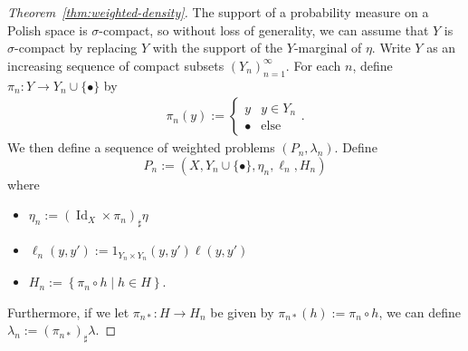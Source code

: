 \documentclass[twoside,11pt]{article}
\DeclareMathOperator{\id}{Id}
\newcommand{\set}[2]{\left\{ #1\middle| #2\right\}}
\begin{document}
\begin{proof}[Theorem~\ref{thm:weighted-density}]
    The support of a probability measure on a Polish space is $\sigma$-compact, so without loss of generality, we can assume that $Y$ is $\sigma$-compact by replacing $Y$ with the support of the $Y$-marginal of $\eta$. Write $Y$ as an increasing sequence of compact subsets $(Y_n)_{n=1}^\infty$. For each $n$, define $\pi_n:Y\to Y_n\cup \{\bullet\}$ by
    \begin{align*}
      \pi_n(y) := \begin{cases}
        y & y\in Y_n\\
        \bullet & \text{else}
      \end{cases}.
    \end{align*}
    We then define a sequence of weighted problems $(P_n,\lambda_n)$. Define
    \[P_n := (X,Y_n\cup \{\bullet\},\eta_n,\ell_n,H_n)\]
    where
    \begin{itemize}
      \item $\eta_n := (\id_X\times \pi_n)_\sharp \eta$
      \item $\ell_n(y,y') := 1_{Y_n\times Y_n}(y,y')\ell(y,y')$
      \item $H_n := \set{\pi_n\circ h}{h\in H}$.
    \end{itemize}
    Furthermore, if we let $\pi_{n*}:H\to H_n$ be given by $\pi_{n*}(h) := \pi_n\circ h$, we can define $\lambda_n := (\pi_{n*})_\sharp \lambda$.


\end{proof}
\end{document}
